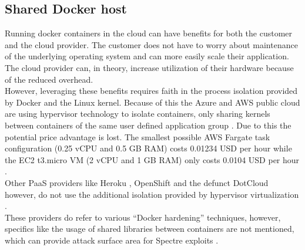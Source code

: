 \documentclass[conference,compsoc,final,a4paper]{IEEEtran}
\begin{document}
\subsection{Shared Docker host}
Running docker containers in the cloud can have benefits for both the customer and the cloud provider. The customer does not have to worry about maintenance of the underlying operating system and can more easily scale their application. The cloud provider can, in theory, increase utilization of their hardware because of the reduced overhead. \\
However, leveraging these benefits requires faith in the process isolation provided by Docker and the Linux kernel. Because of this the Azure and \ac{AWS} public cloud are using hypervisor technology to isolate containers, only sharing kernels between containers of the same user defined application group \cite{fargateIsolation, azureIsolation}. Due to this the potential price advantage is lost. The smallest possible \ac{AWS} Fargate task configuration (0.25 vCPU and 0.5 GB RAM) costs 0.01234 USD per hour \cite{fargatePricing} while the EC2 t3.micro VM (2 vCPU and 1 GB RAM) only costs 0.0104 USD per hour \cite{ec2Pricing}. \\
Other \ac{PaaS} providers like Heroku \cite{herokuIsolation}, OpenShift \cite{openshiftIsolation} and the defunct DotCloud however, do not use the additional isolation provided by hypervisor virtualization \cite{zhang2014cross}. \\
These providers do refer to various \enquote{Docker hardening} techniques, however, specifics like the usage of shared libraries between containers are not mentioned, which can provide attack surface area for Spectre exploits \cite{retpolineTurner}.
\end{document}

